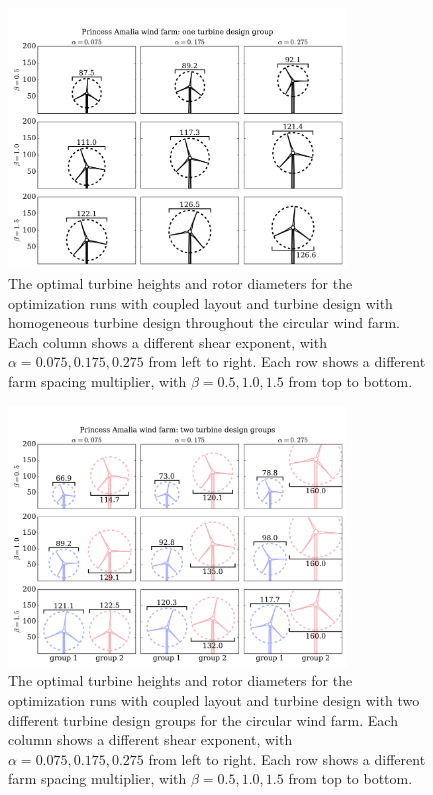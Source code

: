 \begin{figure}[htbp]
  \centering
  \includegraphics[trim={0.5cm 0.3cm 0.3cm 1.75cm},clip,width=0.8\textwidth]{Figures/turbineSizesAmalia_1.pdf}
  \caption{\label{amalia_turbines_1} The optimal turbine heights and rotor diameters for the optimization runs with coupled layout and turbine design with homogeneous turbine design throughout the circular wind farm. Each column shows a different shear exponent, with $\alpha=0.075,0.175,0.275$ from left to right. Each row shows a different farm spacing multiplier, with $\beta=0.5,1.0,1.5$ from top to bottom.}
\end{figure}




\begin{figure}[htbp]
  \centering
  \includegraphics[trim={0.5cm 0.3cm 0.3cm 1.75cm},clip,width=0.8\textwidth]{Figures/turbineSizesAmalia_2.pdf}
  \caption{\label{amalia_turbines} The optimal turbine heights and rotor diameters for the optimization runs with coupled layout and turbine design with two different turbine design groups for the circular wind farm. Each column shows a different shear exponent, with $\alpha=0.075,0.175,0.275$ from left to right. Each row shows a different farm spacing multiplier, with $\beta=0.5,1.0,1.5$ from top to bottom.}
\end{figure}


